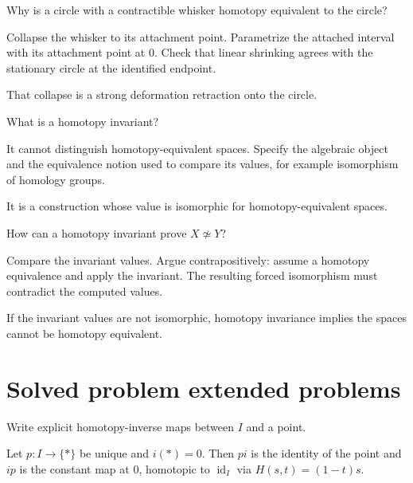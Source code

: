 \begin{exercise}\label{exr:viii02-22}
Why is a circle with a contractible whisker homotopy equivalent to the circle?
\end{exercise}
\begin{hint}Collapse the whisker to its attachment point.
Parametrize the attached interval with its attachment point at \(0\). Check that linear shrinking agrees with the stationary circle at the identified endpoint.
\end{hint}
\begin{solution}
That collapse is a strong deformation retraction onto the circle.
\end{solution}

\begin{exercise}\label{exr:viii02-23}
What is a homotopy invariant?
\end{exercise}
\begin{hint}It cannot distinguish homotopy-equivalent spaces.
Specify the algebraic object and the equivalence notion used to compare its values, for example isomorphism of homology groups.
\end{hint}
\begin{solution}
It is a construction whose value is isomorphic for homotopy-equivalent spaces.
\end{solution}

\begin{exercise}\label{exr:viii02-24}
How can a homotopy invariant prove \(X\not\simeq Y\)?
\end{exercise}
\begin{hint}Compare the invariant values.
Argue contrapositively: assume a homotopy equivalence and apply the invariant. The resulting forced isomorphism must contradict the computed values.
\end{hint}
\begin{solution}
If the invariant values are not isomorphic, homotopy invariance implies the
spaces cannot be homotopy equivalent.
\end{solution}

\section{Solved problem extended problems}

\begin{problem}\label{prob:viii02-01}
Write explicit homotopy-inverse maps between \(I\) and a point.
\end{problem}
\begin{solution}
Let \(p:I\to\{*\}\) be unique and \(i(*)=0\).  Then \(pi\) is the identity of
the point and \(ip\) is the constant map at \(0\), homotopic to
\(\operatorname{id}_I\) via \(H(s,t)=(1-t)s\).
\end{solution}

